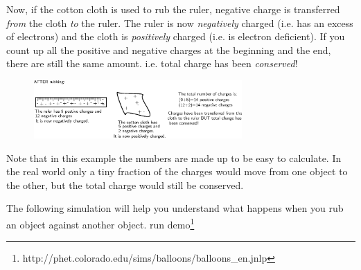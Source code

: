     \addtocounter{footnote}{-0}
    
      \par 
      \label{m38780*id200783}Now, if the cotton cloth is used to rub the ruler, negative charge
is transferred \textsl{from} the cloth \textsl{to} the ruler.
The ruler is now \textsl{negatively} charged (i.e. has an excess of electrons) and the cloth is \textsl{positively} charged (i.e. is electron deficient).
If you count up all the positive and negative charges at the beginning and the end, there are still the same amount. i.e. total charge has been \textsl{conserved}!\par 
      \label{m38780*id200814}
        
    \setcounter{subfigure}{0}


	\begin{figure}[H] %
    \begin{center}
    \label{m38780*id200819!!!underscore!!!media}\label{m38780*id200819!!!underscore!!!printimage}\includegraphics[width=300px]{col11305.imgs/m38780_PG10C8_003.png} %
        
      \vspace{2pt}
    \vspace{.1in}
    
    \end{center}

 \end{figure}   

    \addtocounter{footnote}{-0}
    
      \par 
      \label{m38780*id200825}Note that in this example the numbers are made up to be easy to calculate. In the real world only a tiny fraction of the charges would move from one object to the other, but the total charge would still be conserved.\par \label{m38780*eip-600}The following simulation will help you understand what happens when you rub an object against another object.\newline
     run demo\footnote{http://phet.colorado.edu/sims/balloons/balloons\_en.jnlp}
        

    \setcounter{subfigure}{0}


